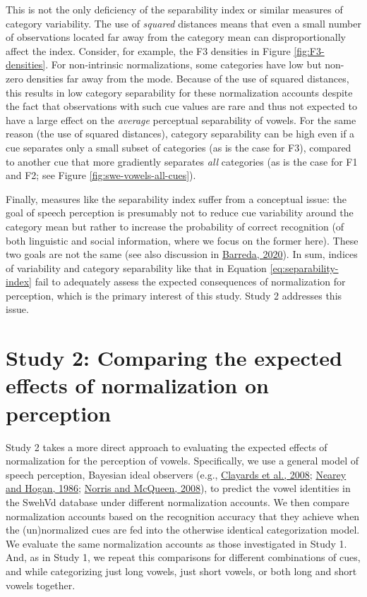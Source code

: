 \documentclass[utf8]{frontiersSCNS}
\begin{document}
This is not the only deficiency of the separability index or similar measures of category variability. The use of \emph{squared} distances means that even a small number of observations located far away from the category mean can disproportionally affect the index. Consider, for example, the F3 densities in Figure \ref{fig:F3-densities}. For non-intrinsic normalizations, some categories have low but non-zero densities far away from the mode. Because of the use of squared distances, this results in low category separability for these normalization accounts despite the fact that observations with such cue values are rare and thus not expected to have a large effect on the \emph{average} perceptual separability of vowels. For the same reason (the use of squared distances), category separability can be high even if a cue separates only a small subset of categories (as is the case for F3), compared to another cue that more gradiently separates \emph{all} categories (as is the case for F1 and F2; see Figure \ref{fig:swe-vowels-all-cues}).

Finally, measures like the separability index suffer from a conceptual issue: the goal of speech perception is presumably not to reduce cue variability around the category mean but rather to increase the probability of correct recognition (of both linguistic and social information, where we focus on the former here). These two goals are not the same (see also discussion in \protect\hyperlink{ref-barreda2020a}{Barreda, 2020}). In sum, indices of variability and category separability like that in Equation \eqref{eq:separability-index} fail to adequately assess the expected consequences of normalization for perception, which is the primary interest of this study. Study 2 addresses this issue.

\hypertarget{sec:studyII}{%
\section*{Study 2: Comparing the expected effects of normalization on perception}\label{sec:studyII}}

Study 2 takes a more direct approach to evaluating the expected effects of normalization for the perception of vowels. Specifically, we use a general model of speech perception, Bayesian ideal observers (e.g., \protect\hyperlink{ref-clayards2008}{Clayards et al., 2008}; \protect\hyperlink{ref-nearey1986a}{Nearey and Hogan, 1986}; \protect\hyperlink{ref-norris-mcqueen2008}{Norris and McQueen, 2008}), to predict the vowel identities in the SwehVd database under different normalization accounts. We then compare normalization accounts based on the recognition accuracy that they achieve when the (un)normalized cues are fed into the otherwise identical categorization model. We evaluate the same normalization accounts as those investigated in Study 1. And, as in Study 1, we repeat this comparisons for different combinations of cues, and while categorizing just long vowels, just short vowels, or both long and short vowels together.
\end{document}
